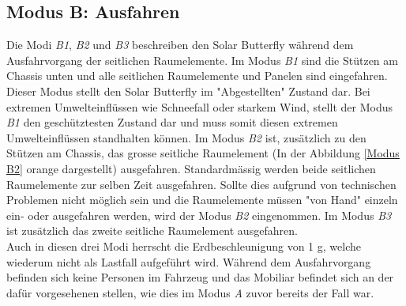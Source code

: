 \subsection{Modus B: Ausfahren}
Die Modi \emph{B1}, \emph{B2} und \emph{B3} beschreiben den Solar Butterfly während dem Ausfahrvorgang der seitlichen Raumelemente. Im Modus \emph{B1} sind die Stützen am Chassis unten und alle seitlichen Raumelemente und Panelen sind eingefahren. Dieser Modus stellt den Solar Butterfly im "Abgestellten" Zustand dar. Bei extremen Umwelteinflüssen wie Schneefall oder starkem Wind, stellt der Modus \emph{B1} den geschütztesten Zustand dar und muss somit diesen extremen Umwelteinflüssen standhalten können.
Im Modus \emph{B2} ist, zusätzlich zu den Stützen am Chassis, das grosse seitliche Raumelement (In der Abbildung \ref{Modus B2} orange dargestellt) ausgefahren. Standardmässig werden beide seitlichen Raumelemente zur selben Zeit ausgefahren. Sollte dies aufgrund von technischen Problemen nicht möglich sein und die Raumelemente müssen "von Hand" einzeln ein- oder ausgefahren werden, wird der Modus \emph{B2} eingenommen. Im Modus \emph{B3} ist zusätzlich das zweite seitliche Raumelement ausgefahren.\\
Auch in diesen drei Modi herrscht die Erdbeschleunigung von 1 g, welche wiederum nicht als Lastfall aufgeführt wird. Während dem Ausfahrvorgang befinden sich keine Personen im Fahrzeug und das Mobiliar befindet sich an der dafür vorgesehenen stellen, wie dies im Modus \emph{A} zuvor bereits der Fall war.


